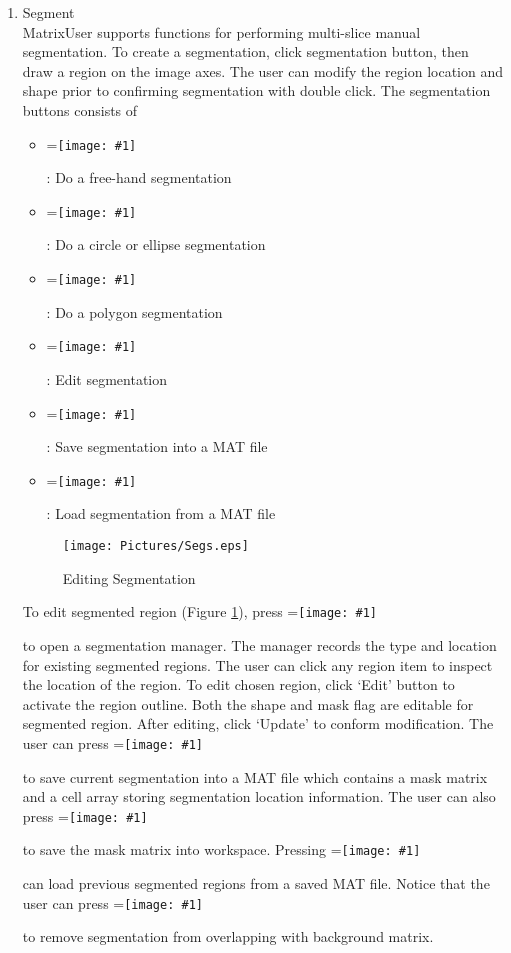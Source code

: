 \documentclass{article}%
\newcommand{\vcenteredinclude}[1]{
\begingroup
\setbox0=\hbox{\texttt{[image: \#1]}}
\parbox{\wd0}{\box0}\endgroup}
\begin{document}
\begin{enumerate}
	\item Segment \\
	
MatrixUser supports functions for performing multi-slice manual segmentation. To create a segmentation, click segmentation button, then draw a region on the image axes. The user can modify the region location and shape prior to confirming segmentation with double click. The segmentation buttons consists of
	
	\begin{itemize}
		\item \vcenteredinclude{Pictures/FreeSeg.eps} : Do a free-hand segmentation
		\item \vcenteredinclude{Pictures/CircleSeg.eps} : Do a circle or ellipse segmentation
		\item \vcenteredinclude{Pictures/PolygonSeg.eps} : Do a polygon segmentation
		\item \vcenteredinclude{Pictures/EditSeg.eps} : Edit segmentation
		\item \vcenteredinclude{Pictures/SaveSeg.eps} : Save segmentation into a MAT file
		\item \vcenteredinclude{Pictures/LoadSeg.eps} : Load segmentation from a MAT file
	\end{itemize}
	
	
\begin{figure}[htbp]
	\centering
		\texttt{[image: Pictures/Segs.eps]}
	\caption{Editing Segmentation}
	\label{fig:Segs}
\end{figure}	

To edit segmented region (Figure \ref{fig:Segs}), press \vcenteredinclude{Pictures/EditSeg.eps} to open a segmentation manager. The manager records the type and location for existing segmented regions. The user can click any region item to inspect the location of the region. To edit chosen region, click `Edit' button to activate the region outline. Both the shape and mask flag are editable for segmented region. After editing, click `Update' to conform modification. The user can press \vcenteredinclude{Pictures/SaveSeg.eps} to save current segmentation into a MAT file which contains a mask matrix and a cell array storing segmentation location information. The user can also press \vcenteredinclude{Pictures/Upload.eps} to save the mask matrix into workspace. Pressing \vcenteredinclude{Pictures/LoadSeg.eps} can load previous segmented regions from a saved MAT file. Notice that the user can press \vcenteredinclude{Pictures/Release.eps} to remove segmentation from overlapping with background matrix. 
	

\end{enumerate}
\end{document}
